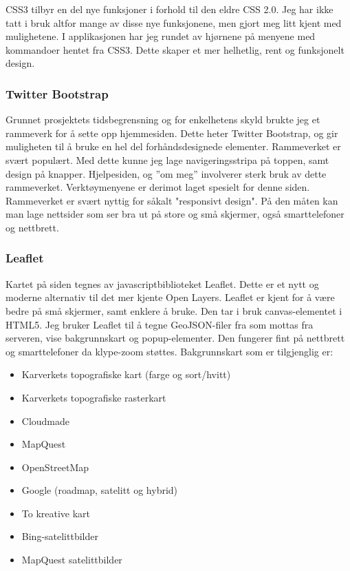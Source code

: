 \documentclass[12pt,twoside,onecolumn]{article}
\begin{document}
		CSS3 tilbyr en del nye funksjoner i forhold til den eldre CSS 2.0. Jeg har ikke tatt i bruk altfor mange av disse nye funksjonene, men gjort meg litt kjent med mulighetene. I applikasjonen har jeg rundet av hjørnene på menyene med kommandoer hentet fra CSS3. Dette skaper et mer helhetlig, rent og funksjonelt design. 
	
		\subsubsection{Twitter Bootstrap}
			
			Grunnet prosjektets tidsbegrensning og for enkelhetens skyld brukte jeg et rammeverk for å sette opp hjemmesiden. Dette heter Twitter Bootstrap, og gir muligheten til å bruke en hel del forhåndsdesignede elementer. Rammeverket er svært populært. Med dette kunne jeg lage navigeringsstripa på toppen, samt design på knapper. Hjelpesiden, og ''om meg'' involverer sterk bruk av dette rammeverket. Verktøymenyene er derimot laget spesielt for denne siden. Rammeverket er svært nyttig for såkalt "responsivt design". På den måten kan man lage nettsider som ser bra ut på store og små skjermer, også smarttelefoner og nettbrett. 
			
		\subsubsection{Leaflet}
		
			Kartet på siden tegnes av javascriptbiblioteket Leaflet. Dette er et nytt og moderne alternativ til det mer kjente Open Layers. Leaflet er kjent for å være bedre på små skjermer, samt enklere å bruke. Den tar i bruk canvas-elementet i HTML5. Jeg bruker Leaflet til å tegne GeoJSON-filer fra som mottas fra serveren, vise bakgrunnskart og popup-elementer. Den fungerer fint på nettbrett og smarttelefoner da klype-zoom støttes. Bakgrunnskart som er tilgjenglig er:
			
			\begin{itemize}
				\item Karverkets topografiske kart (farge og sort/hvitt)
				\item Karverkets topografiske rasterkart
				\item Cloudmade
				\item MapQuest
				\item OpenStreetMap
				\item Google (roadmap, satelitt og hybrid)
				\item To kreative kart
				\item Bing-satelittbilder
				\item MapQuest satelittbilder
			\end{itemize}
			
\end{document}
